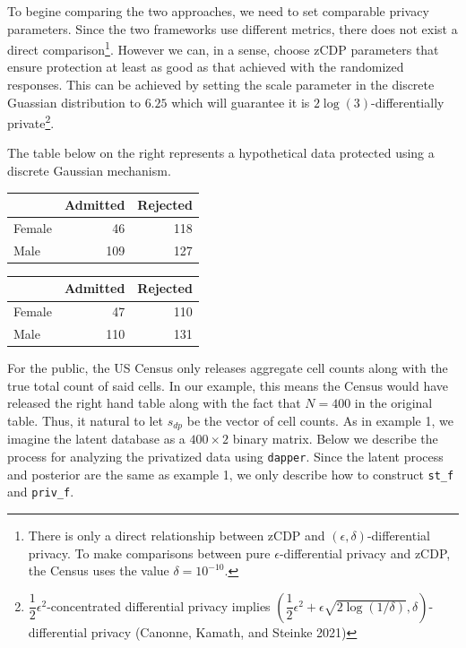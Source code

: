 To begine comparing the two approaches, we need to set comparable privacy parameters.
Since the two frameworks use different metrics, there does not exist
a direct comparison\footnote{There is only a direct relationship between zCDP and \((\epsilon, \delta)\)-differential privacy. To make comparisons between pure \(\epsilon\)-differential privacy and zCDP, the Census uses the value \(\delta = 10^{-10}\).}. However we can, in a sense, choose zCDP parameters that ensure
protection at least as good as that achieved with the randomized responses. This
can be achieved by setting the scale parameter in the discrete Guassian
distribution to \(6.25\) which will guarantee it is \(2\log(3)\)-differentially private\footnote{\(\dfrac{1}{2} \epsilon^2\)-concentrated differential privacy implies \(\left(\dfrac{1}{2}\epsilon^2 + \epsilon \sqrt{2\log(1/\delta)}, \delta\right)\)-differential privacy (Canonne, Kamath, and Steinke 2021)}.

The table below on the right represents a hypothetical data protected using a discrete
Gaussian mechanism.

\begin{table}[!h]
\centering
\centering
\begin{tabular}[t]{lrr}
\toprule
  & Admitted & Rejected\\
\midrule
Female & 46 & 118\\
Male & 109 & 127\\
\bottomrule
\end{tabular}
\centering
\begin{tabular}[t]{lrr}
\toprule
  & Admitted & Rejected\\
\midrule
Female & 47 & 110\\
Male & 110 & 131\\
\bottomrule
\end{tabular}
\end{table}

For the public, the US Census only releases aggregate cell counts along with
the true total count of said cells. In our example,
this means the Census would have released the right hand
table along with the fact that \(N = 400\) in the original
table. Thus, it natural to let \(s_{dp}\) be the vector of cell counts. As in
example 1, we imagine the latent database as a
\(400 \times 2\) binary matrix. Below
we describe the process for analyzing the privatized
data using \texttt{dapper}. Since the latent process
and posterior are the same as example 1, we only describe
how to construct \texttt{st\_f} and \texttt{priv\_f}.

